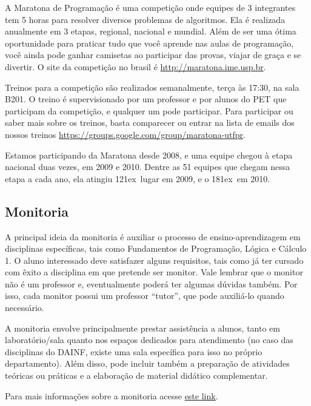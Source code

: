 \documentclass[a4paper,12pt,openany]{article}
\newcommand{\ORD}{\raise1ex\hbox{\underbar{\scriptsize o}}}
\begin{document}
A Maratona de Programação é uma competição onde equipes de 3 integrantes tem 5 horas para resolver diversos problemas de algoritmos. Ela é realizada anualmente em 3 etapas, regional, nacional e mundial. Além de ser uma ótima oportunidade para praticar tudo que você aprende nas aulas de programação, você ainda pode ganhar camisetas ao participar das provas, viajar de graça e se divertir. O site da competição no brasil é \href{http://maratona.ime.usp.br}{http://maratona.ime.usp.br}.

Treinos para a competição são realizados semanalmente, terça às 17:30, na sala B201. O treino é supervisionado por um professor e por alunos do PET que participam da competição, e qualquer um pode participar. Para participar ou saber mais sobre os treinos, basta comparecer ou entrar na lista de emails dos nossos treinos \href{https://groups.google.com/group/maratona-utfpr}{https://groups.google.com/group/maratona-utfpr}. 

Estamos participando da Maratona desde 2008, e uma equipe chegou à etapa nacional duas vezes, em 2009 e 2010. Dentre as 51 equipes que chegam nessa etapa a cada ano, ela atingiu 12\ORD \ lugar em 2009, e o 18\ORD \ em 2010.

\subsection{Monitoria}

A principal ideia da monitoria é auxiliar o processo de ensino-aprendizagem em disciplinas específicas, tais como Fundamentos de Programação, Lógica e Cálculo 1. O aluno interessado deve satisfazer alguns requisitos, tais como já ter cursado com êxito a disciplina em que pretende ser monitor. Vale lembrar que o monitor não é um professor e, eventualmente poderá ter algumas dúvidas também. Por isso, cada monitor possui um professor ``tutor'', que pode auxiliá-lo quando necessário.

A monitoria envolve principalmente prestar assistência a alunos, tanto em laboratório/sala quanto nos espaços dedicados para atendimento (no caso das disciplinas do DAINF, existe uma sala específica para isso no próprio departamento). Além disso, pode incluir também a preparação de atividades teóricas ou práticas e a elaboração de material didático complementar.

Para mais informações sobre a monitoria acesse \href{http://www.utfpr.edu.br/estrutura-universitaria/pro-reitorias/prograd/programas-academicos/programa-de-monitoria}{este link}.
\end{document}
